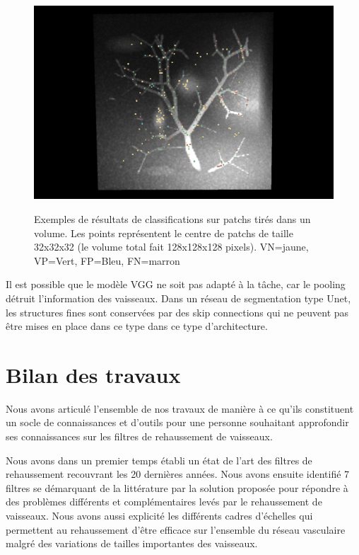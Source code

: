 \begin{figure}[ht]
    \centering
    \includegraphics[height=8cm]{Images/exp_bifurcations.png}
    \caption{Exemples de résultats de classifications sur patchs tirés dans un volume. Les points représentent le centre de patchs de taille 32x32x32 (le volume total fait 128x128x128 pixels). VN=jaune, VP=Vert, FP=Bleu, FN=marron}
    \label{fig:exp_patchs}
\end{figure}

Il est possible que le modèle VGG ne soit pas adapté à la tâche, car le pooling détruit l'information des vaisseaux. Dans un réseau de segmentation type Unet, les structures fines sont conservées par des skip connections qui ne peuvent pas être mises en place dans ce type dans ce type d'architecture.

\section{ Bilan des travaux}

Nous avons articulé l'ensemble de nos travaux de manière à ce qu'ils constituent un socle de connaissances et d'outils pour une personne souhaitant approfondir ses connaissances sur les filtres de rehaussement de vaisseaux. 

Nous avons dans un premier temps établi un état de l'art des filtres de rehaussement recouvrant les 20 dernières années. Nous avons ensuite identifié 7 filtres se démarquant de la littérature par la solution proposée pour répondre à des problèmes différents et complémentaires levés par le rehaussement de vaisseaux. Nous avons aussi explicité les différents cadres d'échelles qui permettent au rehaussement d'être efficace sur l'ensemble du réseau vasculaire malgré des variations de tailles importantes des vaisseaux.

